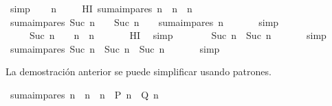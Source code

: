 \begin{isabellebody}
\ simp\isanewline
{}\isamarkupfalse%
\isanewline
\ \ \isamarkupfalse%
\ n\ \isanewline
\ \ \isamarkupfalse%
\ HI{\isacharcolon}\ {\isachardoublequoteopen}suma{\isacharunderscore}impares\ n\ {\isacharequal}\ n\ {\isacharasterisk}\ n{\isachardoublequoteclose}\isanewline
\ \ \isamarkupfalse%
\ {\isachardoublequoteopen}suma{\isacharunderscore}impares\ {\isacharparenleft}Suc\ n{\isacharparenright}\ {\isacharequal}\ {\isacharparenleft}{}\ {\isacharasterisk}\ {\isacharparenleft}Suc\ n{\isacharparenright}\ {\isacharminus}\ {}{\isacharparenright}\ {\isacharplus}\ suma{\isacharunderscore}impares\ n{\isachardoublequoteclose}\ \isanewline
\ \ \ \ \isamarkupfalse%
\ simp\isanewline
\ \ \isamarkupfalse%
\ \isamarkupfalse%
\ {\isachardoublequoteopen}{\isasymdots}\ {\isacharequal}\ {\isacharparenleft}{}\ {\isacharasterisk}\ {\isacharparenleft}Suc\ n{\isacharparenright}\ {\isacharminus}\ {}{\isacharparenright}\ {\isacharplus}\ n\ {\isacharasterisk}\ n{\isachardoublequoteclose}\ \isanewline
\ \ \ \ \isamarkupfalse%
\ HI\ \isamarkupfalse%
\ simp\isanewline
\ \ \isamarkupfalse%
\ \isamarkupfalse%
\ {\isachardoublequoteopen}{\isasymdots}\ {\isacharequal}\ {\isacharparenleft}Suc\ n{\isacharparenright}\ {\isacharasterisk}\ {\isacharparenleft}Suc\ n{\isacharparenright}{\isachardoublequoteclose}\ \isanewline
\ \ \ \ \isamarkupfalse%
\ simp\isanewline
\ \ \isamarkupfalse%
\ \isamarkupfalse%
\ {\isachardoublequoteopen}suma{\isacharunderscore}impares\ {\isacharparenleft}Suc\ n{\isacharparenright}\ {\isacharequal}\ {\isacharparenleft}Suc\ n{\isacharparenright}\ {\isacharasterisk}\ {\isacharparenleft}Suc\ n{\isacharparenright}{\isachardoublequoteclose}\ \isanewline
\ \ \ \ \isamarkupfalse%
\ simp\isanewline
{}\isamarkupfalse%
%
\endisatagproof
{\isafoldproof}%
%
\isadelimproof
%
\endisadelimproof
%
\begin{isamarkuptext}%
La demostración anterior se puede simplificar usando patrones.%
\end{isamarkuptext}\isamarkuptrue%
\isamarkupfalse%
\ {\isachardoublequoteopen}suma{\isacharunderscore}impares\ n\ {\isacharequal}\ n\ {\isacharasterisk}\ n{\isachardoublequoteclose}\ {\isacharparenleft}\ {\isachardoublequoteopen}{\isacharquery}P\ n\ {\isacharequal}\ {\isacharquery}Q\ n{\isachardoublequoteclose}{\isacharparenright}\isanewline

\end{isabellebody}
